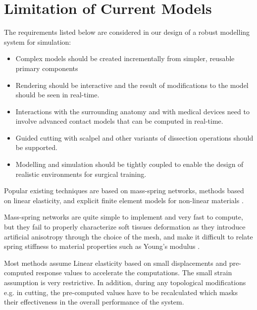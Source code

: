 \section{Limitation of Current Models}
\label{sec:limitationsOfCurrentModels}

The requirements listed below are considered in our design of a robust modelling system for simulation:

\begin{itemize}
  \item Complex models should be created incrementally from simpler, reusable primary components
  \item Rendering should be interactive and the result of modifications to the model should be
  seen in real-time.
  \item Interactions with the surrounding anatomy and with medical devices need to involve advanced 
  contact models that can be computed in real-time.
  \item Guided cutting with scalpel and other variants of dissection operations should be supported.
   
  \item Modelling and simulation should be tightly coupled to enable the design of realistic environments 
  for surgical training.
\end{itemize}


Popular existing techniques are based on mass-spring networks, methods based on linear elasticity, and explicit 
finite element models for non-linear materials \cite{Gibson1997a,Meier2005}. 

Mass-spring networks are quite simple to implement and very fast to compute, but they fail to properly 
characterize soft tissues deformation as they introduce artificial anisotropy through the choice of the 
mesh, and make it difficult to relate spring stiffness to material properties such as Young's modulus 
\cite{Courtecuisse2010}.

Most methods assume Linear elasticity based on small displacements and pre-computed 
response values to accelerate the computations. The small strain assumption is very restrictive. In 
addition, during any topological modifications e.g. in cutting, the pre-computed values 
have to be recalculated which masks their effectiveness in the overall performance of the system.

